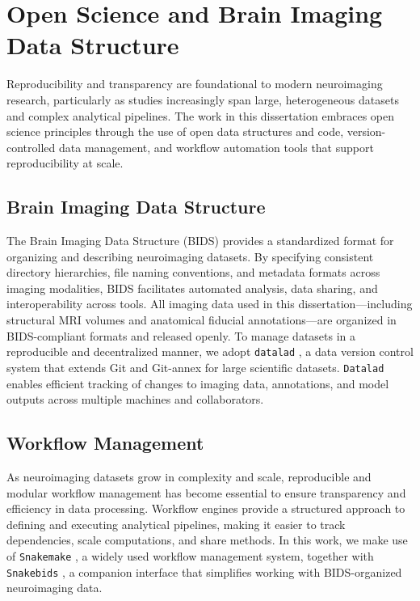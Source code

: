 \section{Open Science and Brain Imaging Data Structure}

Reproducibility and transparency are foundational to modern neuroimaging research, particularly as studies increasingly span large, heterogeneous datasets and complex analytical pipelines. The work in this dissertation embraces open science principles through the use of open data structures and code, version-controlled data management, and workflow automation tools that support reproducibility at scale.

\subsection{Brain Imaging Data Structure}

The Brain Imaging Data Structure (BIDS) \cite{Gorgolewski2016-oh} provides a standardized format for organizing and describing neuroimaging datasets. By specifying consistent directory hierarchies, file naming conventions, and metadata formats across imaging modalities, BIDS facilitates automated analysis, data sharing, and interoperability across tools. All imaging data used in this dissertation—including structural MRI volumes and anatomical fiducial annotations—are organized in BIDS-compliant formats and released openly. To manage datasets in a reproducible and decentralized manner, we adopt \texttt{datalad} \cite{Halchenko2021-px}, a data version control system that extends Git and Git-annex for large scientific datasets. \texttt{Datalad} enables efficient tracking of changes to imaging data, annotations, and model outputs across multiple machines and collaborators.

\subsection{Workflow Management}
As neuroimaging datasets grow in complexity and scale, reproducible and modular workflow management has become essential to ensure transparency and efficiency in data processing. Workflow engines provide a structured approach to defining and executing analytical pipelines, making it easier to track dependencies, scale computations, and share methods. In this work, we make use of \texttt{Snakemake} \cite{Molder2021-ig,Koster2012-ok}, a widely used workflow management system, together with \texttt{Snakebids} \cite{Van-Dyken-Tristan-Kuehn-Jason-Kai-Dahananjhay-Bansal-Ali-Khan2020-ay}, a companion interface that simplifies working with BIDS-organized neuroimaging data.

